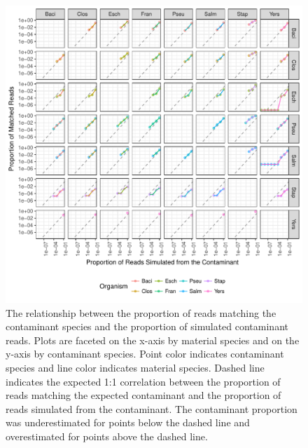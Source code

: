 \documentclass[fleqn,10pt,lineno]{wlpeerj}\usepackage[]{graphicx}\usepackage[]{color}
\makeatletter
\def\maxwidth{ %
  \ifdim\Gin@nat@width>\linewidth
    \linewidth
  \else
    \Gin@nat@width
  \fi
}
\newenvironment{knitrout}{}{} %
\makeatother
\begin{document}
\begin{knitrout}
\color{fgcolor}\begin{figure}
\includegraphics[width=\maxwidth]{figure/contam_fig-1} \caption[The relationship between the proportion of reads matching the contaminant species and the proportion of simulated contaminant reads]{The relationship between the proportion of reads matching the contaminant species and the proportion of simulated contaminant reads. Plots are faceted on the x-axis by material species and on the y-axis by contaminant species. Point color indicates contaminant species and line color indicates material species. Dashed line indicates the expected 1:1 correlation between the proportion of reads matching the expected contaminant and the proportion of reads simulated from the contaminant. The contaminant proportion was underestimated for points below the dashed line and overestimated for points above the dashed line.}\label{fig:contam_fig}
\end{figure}


\end{knitrout}
\end{document}
